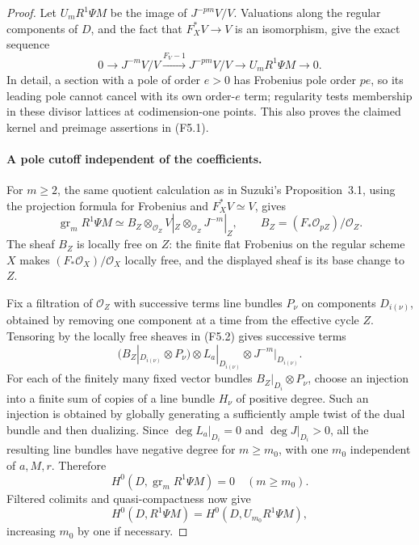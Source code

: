 \begin{proof}
Let $U_mR^1\Psi M$ be the image of $J^{-pm}V/V$.
Valuations along the regular components of $D$, and the fact that
$F_X^*V\to V$ is an isomorphism, give the exact sequence
\[
 0\longrightarrow J^{-m}V/V
 \xrightarrow{F_V-1}J^{-pm}V/V
 \longrightarrow U_mR^1\Psi M\longrightarrow0.
 \tag{F5.1}
\]
In detail, a section with a pole of order $e>0$ has Frobenius pole
order $pe$, so its leading pole cannot cancel with its own order-$e$
term; regularity tests membership in these divisor lattices at
codimension-one points. This also proves the claimed kernel and
preimage assertions in (F5.1).

\paragraph{A pole cutoff independent of the coefficients.}
For $m\geq2$, the same quotient calculation as in Suzuki's
Proposition~3.1, using the projection formula for Frobenius and
$F_X^*V\simeq V$, gives
\[
 \operatorname{gr}_m R^1\Psi M
 \simeq B_Z\otimes_{\mathcal O_Z}V|_Z
                  \otimes_{\mathcal O_Z}J^{-m}|_Z,
 \qquad
 B_Z=(F_*\mathcal O_{pZ})/\mathcal O_Z.
 \tag{F5.2}
\]
The sheaf $B_Z$ is locally free on $Z$: the finite flat Frobenius
on the regular scheme $X$ makes $(F_*\mathcal O_X)/\mathcal O_X$
locally free, and the displayed sheaf is its base change to $Z$.

Fix a filtration of $\mathcal O_Z$ with successive terms line bundles
$P_\nu$ on components $D_{i(\nu)}$, obtained by removing one
component at a time from the effective cycle $Z$. Tensoring by the
locally free sheaves in (F5.2) gives successive terms
\[
 (B_Z|_{D_{i(\nu)}}\otimes P_\nu)
   \otimes L_a|_{D_{i(\nu)}}
   \otimes J^{-m}|_{D_{i(\nu)}}.
\]
For each of the finitely many fixed vector bundles
$B_Z|_{D_i}\otimes P_\nu$, choose an injection into a finite sum
of copies of a line bundle $H_\nu$ of positive degree. Such an
injection is obtained by globally generating a sufficiently ample
twist of the dual bundle and then dualizing. Since
$\deg L_a|_{D_i}=0$ and $\deg J|_{D_i}>0$, all the resulting line
bundles have negative degree for $m\geq m_0$, with one $m_0$
independent of $a,M,r$. Therefore
\[
 H^0(D,\operatorname{gr}_mR^1\Psi M)=0
 \quad(m\geq m_0).
\]
Filtered colimits and quasi-compactness now give
\[
 H^0(D,R^1\Psi M)=H^0(D,U_{m_0}R^1\Psi M),
 \tag{F5.3}
\]
increasing $m_0$ by one if necessary.


\end{proof}
